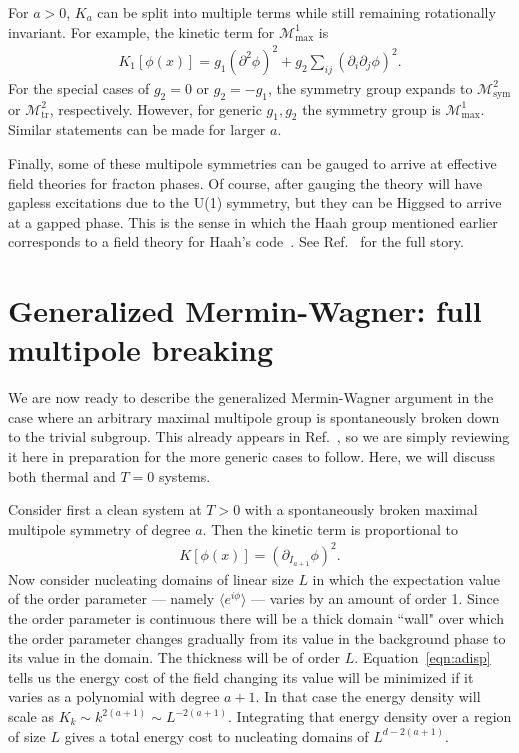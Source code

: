 \documentclass[pra,aps,twocolumn, amsfonts,amsmath,amssymb,nofootinbib,superscriptaddress]{revtex4-2}
\renewcommand{\max}{\text{max}}
\begin{document}
For $a>0$, $K_a$ can be split into multiple terms while still remaining rotationally invariant. For example, the kinetic term for $\mathcal{M}^1_\max$ is 
\begin{align}
K_1[\phi(x)] = g_1 (\partial^2\phi)^2 + g_2 \sum_{ij} (\partial_i \partial_j \phi)^2.
\end{align}
For the special cases of $g_2=0$ or $g_2=-g_1$, the symmetry group expands to $\mathcal{M}^2_\text{sym}$ or $\mathcal{M}^2_\text{tr}$, respectively. However, for generic $g_1,g_2$ the symmetry group is $\mathcal{M}^1_\max$. Similar statements can be made for larger $a$.

Finally, some of these multipole symmetries can be gauged to arrive at effective field theories for fracton phases. Of course, after gauging the theory will have gapless excitations due to the U(1) symmetry, but they can be Higgsed to arrive at a gapped phase. This is the sense in which the Haah group mentioned earlier corresponds to a field theory for Haah's code~\cite{BB}. See Ref.~\cite{BB, Gromov2019} for the full story. 

\section{Generalized Mermin-Wagner: full multipole breaking}\label{sec:full_breaking}

We are now ready to describe the generalized Mermin-Wagner argument in the case where an arbitrary maximal multipole group is spontaneously broken down to the trivial subgroup. This already appears in Ref.~\cite{Griffin2015}, so we are simply reviewing it here in preparation for the more generic cases to follow. Here, we will discuss both thermal and $T=0$ systems.

Consider first a clean system at $T>0$ with a spontaneously broken maximal multipole symmetry of degree $a$.
Then the kinetic term is proportional to 
\begin{align}
K[\phi(x)] = (\partial_{I_{a+1}} \phi)^2. \label{eqn:adisp}
\end{align} 
Now consider nucleating domains of linear size $L$ in which the expectation value of the order parameter --- namely $\langle e^{i\phi}\rangle$ --- varies by an amount of order 1. Since the order parameter is continuous there will be a thick domain ``wall" over which the order parameter changes gradually from its value in the background phase to its value in the domain. The thickness will be of order $L$.
Equation~\ref{eqn:adisp} tells us the  energy cost of the field changing its value will be minimized if it varies as a polynomial with degree $a+1$. In that case the energy density will scale as $K_k \sim k^{2(a+1)} \sim L^{-2(a+1)}$. Integrating that energy density over a region of size $L$ gives a total energy cost to nucleating domains of $L^{d-2(a+1)}$.
\end{document}
